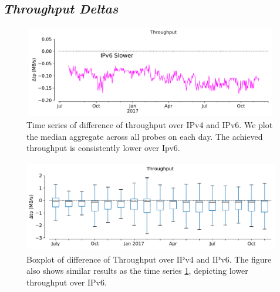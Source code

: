 \subsection*{\textit{Throughput Deltas}}

\begin{figure}[!ht]
	\centering
	\includegraphics[keepaspectratio, height=4cm, width=15cm]{figures/throughput/netflix-throughput-timeseries.pdf}
	\caption[Throughput Timeseries]{Time series of difference of throughput over IPv4 and IPv6. We plot the median aggregate across all probes on each day. The achieved throughput is consistently lower over Ipv6.}
	\label{fig:Throughput Timeseries}
\end{figure}

\begin{figure}[!ht]
	\centering
	\includegraphics[keepaspectratio, height=4cm, width=15cm]{figures/throughput/netflix-throughput-boxplot.pdf}
	\caption[Throughput Boxplot]{Boxplot of difference of Throughput over IPv4 and IPv6. The figure also shows similar results as the time series \cref{fig:Throughput Timeseries}, depicting lower throughput over IPv6.}
	\label{fig:Throughput Boxplot}
\end{figure}

